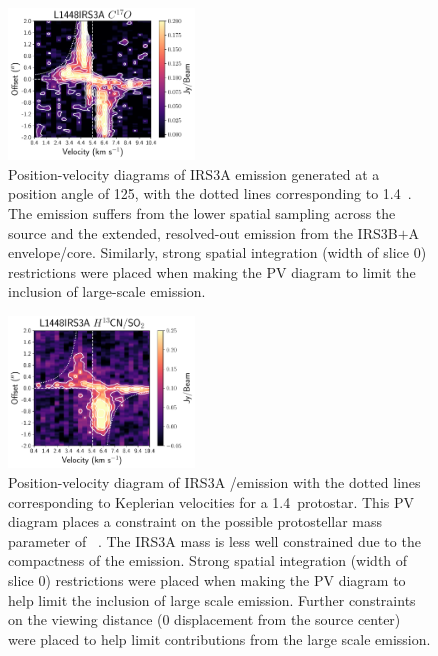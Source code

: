 \begin{figure}[H]
\begin{center}
\includegraphics[width=0.44\textwidth]{img/PV-Diagram_L1448IRS3B_C17O_clean_binnedwide.pdf}
\end{center}
\caption{Position-velocity diagrams of IRS3A \cso\space emission generated at a position angle of 125\deg, with the dotted lines corresponding to 1.4~\solm. The emission suffers from the lower spatial sampling across the source and the extended, resolved-out emission from the IRS3B$+$A envelope/core. Similarly, strong spatial integration (width of slice 0) restrictions were placed when making the PV diagram to limit the inclusion of large-scale emission. }\label{fig:l1448irs3a_cso_pv}
\end{figure}








\begin{figure}[H]
\begin{center}
\includegraphics[width=0.44\textwidth]{img/irs3a_h13cn_pv.pdf}
\end{center}
\caption{Position-velocity diagram of IRS3A \htcn/\sot\space emission with the dotted lines corresponding to Keplerian velocities for a 1.4~\solm\space protostar. This PV diagram places a constraint on the possible protostellar mass parameter of ~\solm. The IRS3A mass is less well constrained due to the compactness of the emission. Strong spatial integration (width of slice 0) restrictions were placed when making the PV diagram to help limit the inclusion of large scale emission. Further constraints on the viewing distance (0 displacement from the source center) were placed to help limit contributions from the large scale emission.}\label{fig:l1448irs3a_h13cn_pv}
\end{figure}


